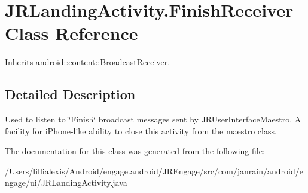 \hypertarget{classcom_1_1janrain_1_1android_1_1engage_1_1ui_1_1_j_r_landing_activity_1_1_finish_receiver}{
\section{JRLandingActivity.FinishReceiver Class Reference}
\label{classcom_1_1janrain_1_1android_1_1engage_1_1ui_1_1_j_r_landing_activity_1_1_finish_receiver}
}


Inherits android::content::BroadcastReceiver.



\subsection{Detailed Description}
Used to listen to \char`\"{}Finish\char`\"{} broadcast messages sent by JRUserInterfaceMaestro. A facility for iPhone-\/like ability to close this activity from the maestro class. 

The documentation for this class was generated from the following file:\begin{DoxyCompactItemize}
\item 
/Users/lillialexis/Android/engage.android/JREngage/src/com/janrain/android/engage/ui/JRLandingActivity.java\end{DoxyCompactItemize}
